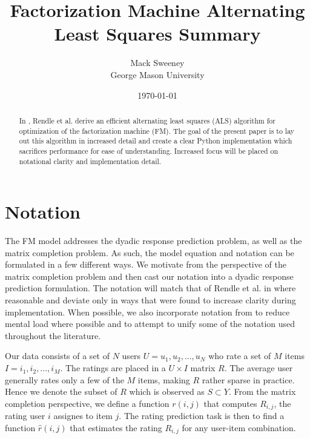 \documentclass[10pt]{journal}
\title{Factorization Machine Alternating Least Squares Summary}
\author{
    Mack Sweeney\\
        George Mason University
}
\date{\today}
\begin{document}
\maketitle


\begin{abstract}

In \cite{rendle_fast_2011}, Rendle et al. derive an efficient alternating least
squares (ALS) algorithm for optimization of the factorization machine (FM). The
goal of the present paper is to lay out this algorithm in increased detail and
create a clear Python implementation which sacrifices performance for ease of
understanding. Increased focus will be placed on notational clarity and
implementation detail.

\end{abstract}


\section{Notation}

The FM model addresses the dyadic response prediction problem, as well as the
matrix completion problem. As such, the model equation and notation can be
formulated in a few different ways. We motivate from the perspective of the
matrix completion problem and then cast our notation into a dyadic response
prediction formulation. The notation will match that of Rendle et al. in
\cite{rendle_fast_2011} where reasonable and deviate only in ways that were
found to increase clarity during implementation. When possible, we also
incorporate notation from \cite{agarwal_regression-based_2009} to reduce mental
load where possible and to attempt to unify some of the notation used throughout
the literature.

Our data consists of a set of $N$ users $U = {u_1, u_2, ..., u_N}$ who rate a
set of $M$ items $I = {i_1, i_2, ..., i_M}$. The ratings are placed in a $U
\times I$ matrix $R$. The average user generally rates only a few of the $M$
items, making $R$ rather sparse in practice. Hence we denote the subset of $R$
which is observed as $S \subset Y$. From the matrix completion perspective, we
define a function $r(i, j)$ that computes $R_{i, j}$, the rating user $i$
assignes to item $j$. The rating prediction task is then to find a function
$\hat{r}(i, j)$ that estimates the rating $R_{i,j}$ for any user-item
combination.
\end{document}
